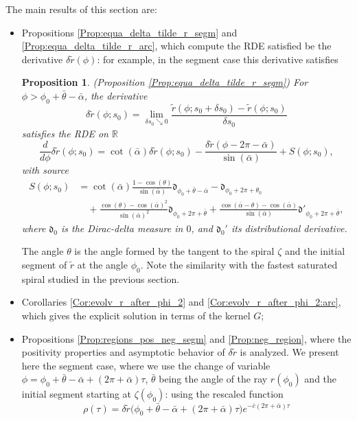\documentclass[reqno]{amsart}
\theoremstyle{definition} \newtheorem{definition}{Definition}[section]
\theoremstyle{definition} \newtheorem{remark}[definition]{Remark}
\theoremstyle{plain} \newtheorem{lemma}[definition]{Lemma}
\theoremstyle{plain} \newtheorem{proposition}[definition]{Proposition}
\theoremstyle{plain} \newtheorem{theorem}[definition]{Theorem}
\theoremstyle{plain} \newtheorem{corollary}[definition]{Corollary}
\theoremstyle{definition} \newtheorem{example}[definition]{Example}
\theoremstyle{plain} \newtheorem{claim}[clai]{Claim}
\theoremstyle{definition} \newtheorem{assumption}[definition]{Assumption}
\theoremstyle{definition} \newtheorem{observation}[definition]{Observation}
\newcommand{\R}{\mathbb{R}}
\newcommand{\1}{\mathbbm 1}
\newcommand{\Diracd}{\mathfrak{d}}
\numberwithin{equation}{section} %
\theoremstyle{plain} \newtheorem*{theorem*}{Theorem}
\theoremstyle{plain} \newtheorem{mthm}[maintheorem]{Main Theorem}
\theoremstyle{plain} \newtheorem*{mthm*}{Main Theorem}
\theoremstyle{plain} \newtheorem*{conjecture*}{Conjecture}
\theoremstyle{plain} \newtheorem{conjecture}[definition]{Conjecture}
\theoremstyle{plain} \newtheorem*{problem*}{Problem}
\begin{document}
The main results of this section are:
\begin{itemize}
\item Propositions \ref{Prop:equa_delta_tilde_r_segm} and \ref{Prop:equa_delta_tilde_r_arc}, which compute the RDE satisfied be the derivative $\delta \tilde r(\phi)$: for example, in the segment case this derivative satisfies

\begin{proposition}(Proposition \ref{Prop:equa_delta_tilde_r_segm})
\label{Prop:equa_delta_tilde_r_segm_intro}
For $\phi > \phi_0 + \bar \theta - \bar \alpha$, the derivative 
$$
\delta \tilde r(\phi;s_0) = \lim_{\delta s_0 \searrow 0} \frac{\tilde r(\phi;s_0 + \delta s_0) - \tilde r(\phi;s_0)}{\delta s_0}
$$
satisfies the RDE on $\R$
\begin{equation*}
\frac{d}{d\phi} \delta \tilde r(\phi;s_0) = \cot(\bar \alpha) \delta \tilde r(\phi;s_0) - \frac{\delta \tilde r(\phi - 2\pi - \bar \alpha)}{\sin(\bar \alpha)} + S(\phi;s_0),
\end{equation*}
with source
\begin{align*}
S(\phi;s_0) &= \cot(\bar \alpha) \frac{1 - \cos(\theta)}{\sin(\bar \alpha)} \Diracd_{\phi_0 + \bar \theta - \bar \alpha} - \Diracd_{\phi_0 + 2\pi + \theta_0} \\
& \quad + \frac{\cos(\theta) - \cos(\bar \alpha)^2}{\sin(\bar \alpha)^2} \Diracd_{\phi_0 + 2\pi + \bar \theta} + \frac{\cos(\bar \alpha - \theta) - \cos(\bar \alpha)}{\sin(\bar \alpha)} \Diracd'_{\phi_0 + 2\pi + \bar \theta},
\end{align*}
where $\Diracd_0$ is the Dirac-delta measure in $0$, and $\Diracd_0'$ its distributional derivative.
\end{proposition}
The angle $\theta$ is the angle formed by the tangent to the spiral $\zeta$ and the initial segment of $\tilde r$ at the angle $\phi_0$. Note the similarity with the fastest saturated spiral studied in the previous section.

\item Corollaries \ref{Cor:evolv_r_after_phi_2} and \ref{Cor:evolv_r_after_phi_2:arc}, which gives the explicit solution in terms of the kernel $G$;

\item Propositions \ref{Prop:regions_pos_neg_segm} and \ref{Prop:neg_region}, where the positivity properties and asymptotic behavior of $\delta \tilde r$ is analyzed. We present here the segment case, where we use the change of variable $\phi = \phi_0 + \bar \theta - \bar \alpha + (2\pi + \bar \alpha) \tau$, $\bar \theta$ being the angle of the ray $r(\phi_0)$ and the initial segment starting at $\zeta(\phi_0)$: using the rescaled function
\begin{equation*}
\rho(\tau) = \delta \tilde r \big( \phi_0 + \bar \theta - \bar \alpha + (2\pi + \bar \alpha) \tau \big) e^{-\bar c (2 \pi + \bar \alpha) \tau}
\end{equation*}


\end{itemize}
\end{document}
